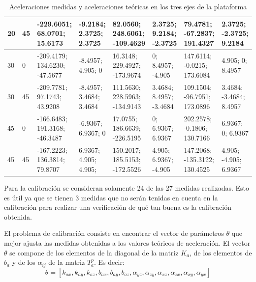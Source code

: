 \documentclass[main]{subfiles}
\begin{document}
\begin{table}[H]
\begin{tiny}
\begin{tabular}{p{30pt}p{30pt}|p{40pt}|p{26pt}|p{40pt}|p{26pt}|p{40pt}|p{26pt}|}
\multicolumn{1}{|p{30pt}|}{20} & 45 &   -229.6051;     68.0701;    15.6173 & -9.2184;    2.3725;    2.3725 & 82.0560;       248.6061;     -109.4629 & 2.3725;    9.2184;    -2.3725 & 79.4781;    -67.2837;     191.4327 & 2.3725;    -2.3725;	9.2184    \\ \hline
\multicolumn{1}{|p{30pt}|}{30} & 0  &  -209.4179;    134.6230;    -47.5677 &       -8.4957;     4.905;    0 & 16.3148;    229.4927;     -173.9674 & 0;		8.4957;		-4.905 & 147.6114;    -0.0215;    173.6084 &  4.905;    0;	8.4957\\ \hline
\multicolumn{1}{|p{30pt}|}{30} & 45 & -209.7781;    97.1743;    43.9208 & -8.4957;    3.4684;    3.4684 & 111.5630;       228.5963;     -134.9143 & 3.4684;    8.4957;	-3.4684 & 109.1504;       -96.7951;     173.0896 & 3.4684;    -3.4684;    8.4957\\ \hline
\multicolumn{1}{|p{30pt}|}{45} & 0  &  -166.6483;    191.3168;    -46.3487 &       -6.9367;    6.9367;    0 & 17.0755;      186.6639;      -226.5195 & 0;          6.9367;    6.9367 & 202.2578;    -0.1806;    130.7166 & 6.9367;    0;         6.9367\\ \hline
\multicolumn{1}{|p{30pt}|}{45} & 45 & -167.2223;    136.3814;    79.8707 &  6.9367;	4.905;     4.905;     & 150.2017;       185.5153;     -172.5526 & 4.905;    6.9367; -4.905      & 147.2068;    -135.3122;     130.4525 &  4.905;    -4.905;	6.9367     \\ \hline


\end{tabular}
\end{tiny}
\caption{Aceleraciones medidas y aceleraciones teóricas en los tres ejes de la plataforma}
\label{tab:acc}
\end{table} 

Para la calibración se consideran solamente 24 de las 27 medidas realizadas. Esto es útil ya que se tienen 3 medidas que no serán tenidas en cuenta en la calibración para realizar una verificación de qué tan buena es la calibración obtenida.

El problema de calibración consiste en encontrar el vector de parámetros $\theta$ que mejor ajusta las medidas obtenidas a los valores teóricos de aceleración. El vector $\theta$ se compone de los elementos de la diagonal de la matriz $K_a$, de los elementos de $b_a$ y de los $\alpha_{ij}$ de la matriz $T_a^p$. Es decir: 
\begin{equation}
\theta =\left[ k_{ax} , k_{ay} , k_{az} ,b_{ax} ,b_{ay} ,b_{az}, \alpha_{yz} , \alpha_{zy} , \alpha_{xz} , \alpha_{zx} , \alpha_{xy} , \alpha_{yx} \right]\end{equation}
\end{document}
